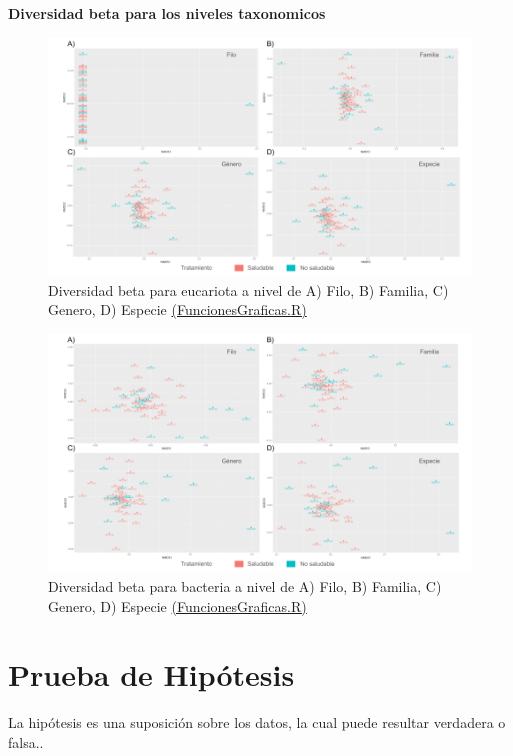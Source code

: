 \textbf{Diversidad beta para los niveles taxonomicos}

\begin{figure}[h]
\centering
\includegraphics[width=\textwidth]{Img/cap2/Beta_Eukarya.png}
\caption{Diversidad beta para eucariota a nivel de A) Filo, B) Familia, C) Genero, D) Especie \href{https://github.com/CamilaSilva1995/Tesis_Maestria/blob/main/Analisis_Comparativo/Fresa_Solena/20230227_Funciones&Graficas.R}{(FuncionesGraficas.R)}}
\end{figure}

\begin{figure}[h]
\centering
\includegraphics[width=\textwidth]{Img/cap2/Beta_Bacteria.png}
\caption{Diversidad beta para bacteria a nivel de A) Filo, B) Familia, C) Genero, D) Especie \href{https://github.com/CamilaSilva1995/Tesis_Maestria/blob/main/Analisis_Comparativo/Fresa_Solena/20230227_Funciones&Graficas.R}{(FuncionesGraficas.R)}}
\end{figure}


\section{Prueba de Hipótesis}
La hipótesis es una suposición sobre los datos, la cual puede resultar verdadera o falsa..\\

